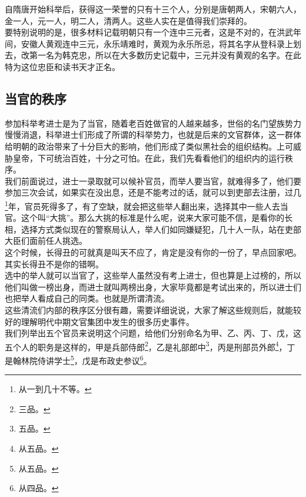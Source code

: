 \begin{multicols}{\theparacolNo}
自隋唐开始科举后，获得这一荣誉的只有十三个人，分别是唐朝两人，宋朝六人，金一人，元一人，明二人，清两人。这些人实在是值得我们崇拜的。\\

要特别说明的是，很多材料记载明朝只有一个连中三元者，这是不对的，在洪武年间，安徽人黄观连中三元，永乐靖难时，黄观为永乐所忌，将其名字从登科录上划去，改第一名为韩克忠，所以在大多数历史记载中，三元并没有黄观的名字。在此特为这位忠臣和读书天才正名。\\

\subsection{当官的秩序}
参加科举考进士是为了当官，随着老百姓做官的人越来越多，世俗的名门望族势力慢慢消退，科举进士们形成了所谓的科举势力，也就是后来的文官群体，这一群体给明朝的政治带来了十分巨大的影响，他们形成了类似黑社会的组织结构。上可威胁皇帝，下可统治百姓，十分之可怕。在此，我们先看看他们的组织内的运行秩序。\\

我们前面说过，进士一录取就可以候补官员，而举人要当官，就难得多了，他们要参加三次会试，如果实在没出息，还是不能考过的话，就可以到吏部去注册，过几\footnote{从一到几十不等。}年，官员死得多了，有了空缺，就会把这些举人翻出来，选择其中一些人去当官。这个叫“大挑”。那么大挑的标准是什么呢，说来大家可能不信，是看你的长相，选择方式类似现在的警察局认人，举人们如同嫌疑犯，几十人一队，站在吏部大臣们面前任人挑选。\\

这个时候，长得丑的可就真是叫天不应了，肯定是没有你的一份了，早点回家吧。\\

其实长得丑不是你的错啊。\\

选中的举人就可以当官了，这些举人虽然没有考上进士，但也算是上过榜的，所以他们叫做一榜出身，而进士就叫两榜出身，大家毕竟都是考试出来的，所以进士们也把举人看成自己的同类。也就是所谓清流。\\

这些清流们内部的秩序区分很有趣，需要详细说说，大家了解这些规则后，就能较好的理解明代中期文官集团中发生的很多历史事件。\\

我们列举出五个官员来说明这个问题，给他们分别命名为甲、乙、丙、丁、戊，这五个人的职务是这样的，甲是兵部侍郎\footnote{三品。}，乙是礼部郎中\footnote{五品。}，丙是刑部员外郎\footnote{从五品。}，丁是翰林院侍讲学士\footnote{从五品。}，戊是布政史参议\footnote{从四品。}。\\


\end{multicols}
